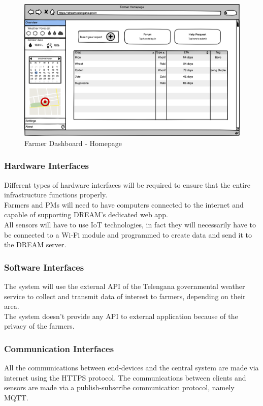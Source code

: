\documentclass[10pt]{article}
\begin{document}
\begin{figure}[ht!]
    \centering
    \includegraphics[scale=0.15]{ui/f_homepage.png}
    \caption{Farmer Dashboard - Homepage}
\end{figure}
\newpage
\clearpage
\subsubsection{Hardware Interfaces}
Different types of hardware interfaces will be required to ensure that the entire infrastructure functions properly.\\
Farmers and PMs will need to have computers connected to the internet and capable of supporting DREAM's dedicated web app.\\
All sensors will have to use IoT technologies\cite{irrigation}, in fact they will necessarily have to be connected to a Wi-Fi module and programmed to create data and send it to the DREAM server. 
\subsubsection{Software Interfaces}
The system will use the external API of the Telengana governmental weather service to collect and transmit data of interest to farmers, depending on their area.\\
The system doesn't provide any API to external application because of the privacy of the farmers.
\subsubsection{Communication Interfaces}
All the communications between end-devices and the central system are made via internet using the HTTPS protocol.
The communications between clients and sensors are made via a publish-subscribe communication protocol, namely MQTT.
\end{document}
